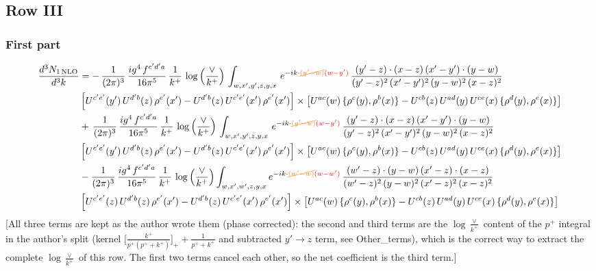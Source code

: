 \documentclass[9pt]{article}
\numberwithin{equation}{section}
\begin{document}
\subsection{Row III}
 \subsubsection{First part}
\begin{align}
     \frac{d^{3}N_{1\,\rm NLO}}{d^{3}k} & =   -\,\frac{1}{(2\pi)^{3}}\, \frac{ig^{4}\,f^{c'd'a}}{16\pi^{5}}\, \frac{1}{k^{+}}\,\log{\left(\frac{\vee}{k^{+}}\right)}\, \int_{w,x',y',z,y,x}\, e^{-ik\cdot {\color{orange}\cancel{(y'-w)}}{\color{red}(w-y')}}\,\frac{(y'-z)\cdot (x-z)\,(x'-y')\cdot (y-w)}{(y'-z)^{2}\,(x'-y')^{2}\,(y-w)^{2}\,(x-z)^{2}}\notag \\ &  \left[U^{c'e'}(y')\,U^{d'b}(z)\,\rho^{e'}(x')-U^{d'b}(z)\,U^{c'e'}(x')\,\rho^{e'}(x')\right]\times  \left[U^{ac}(w)\, \{\rho^{c}(y),\rho^{b}(x)\}-U^{cb}(z)\,U^{ad}(y)\,U^{ce}(x)\,\{\rho^{d}(y),\rho^{e}(x)\}\right] \notag \\
&   +\,\frac{1}{(2\pi)^{3}}\, \frac{ig^{4}\,f^{c'd'a}}{16\pi^{5}}\, \frac{1}{k^{+}}\,\log{\left(\frac{\vee}{k^{+}}\right)}\, \int_{w,x',y',z,y,x}\, e^{-ik\cdot {\color{orange}\cancel{(y'-w)}}{\color{red}(w-y')}}\,\frac{(y'-z)\cdot (x-z)\,(x'-y')\cdot (y-w)}{(y'-z)^{2}\,(x'-y')^{2}\,(y-w)^{2}\,(x-z)^{2}}\notag \\ &    \left[U^{c'e'}(y')\,U^{d'b}(z)\,\rho^{e'}(x')-U^{d'b}(z)\,U^{c'e'}(x')\,\rho^{e'}(x')\right]\times  \left[U^{ac}(w)\, \{\rho^{c}(y),\rho^{b}(x)\}-U^{cb}(z)\,U^{ad}(y)\,U^{ce}(x)\,\{\rho^{d}(y),\rho^{e}(x)\}\right] \notag \\
&   -\frac{1}{(2\pi)^{3}}\, \frac{ig^{4}\,f^{c'd'a}}{16\pi^{5}}\, \frac{1}{k^{+}}\,\log{\left(\frac{\vee}{k^{+}}\right)}\int_{w,x',w',z,y,x} e^{-ik\cdot {\color{orange}\cancel{(w'-w)}}{\color{red}(w-w')}}\,\frac{(w'-z)\cdot (y-w)\,(x'-z)\cdot (x-z)}{(w'-z)^{2}\,(y-w)^{2}\,(x'-z)^{2}\,(x-z)^{2}}\notag \\
&   \left[U^{c'e'}(z)\,U^{d'b}(z)\,\rho^{e'}(x')-U^{d'b}(z)\,U^{c'e'}(x')\,\rho^{e'}(x')\right]  \times\left[U^{ac}(w)\, \{\rho^{c}(y),\rho^{b}(x)\}-U^{cb}(z)\,U^{ad}(y)\,U^{ce}(x)\,\{\rho^{d}(y),\rho^{e}(x)\}\right]
\end{align} {\color{red}[All three terms are kept as the author wrote them (phase corrected): the second and third terms are the $\log\frac{\vee}{k^{+}}$ content of the $p^{+}$ integral in the author's split (kernel $\big[\frac{k^{+}}{p^{+}(p^{+}+k^{+})}\big]_{+}+\frac{1}{p^{+}+k^{+}}$ and subtracted $y'\to z$ term, see Other\_terms), which is the correct way to extract the complete $\log\frac{\vee}{k^{+}}$ of this row. The first two terms cancel each other, so the net coefficient is the third term.]}\par\noindent
\end{document}

